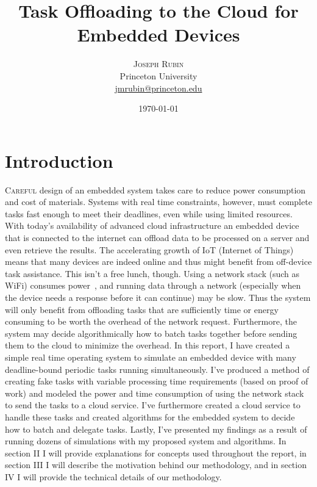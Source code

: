 \documentclass[twoside,twocolumn]{article}
\title{Task Offloading to the Cloud for Embedded Devices} %
\author{%
\textsc{Joseph Rubin} \\[1ex] %
\normalsize Princeton University \\ %
\normalsize \href{mailto:jmrubin@princeton.edu}{jmrubin@princeton.edu} %
}
\date{\today} %
\newcommand{\newp}{\newline\indent}
\begin{document}
\maketitle


\section{Introduction}

\lettrine[nindent=0em,lines=3]{C}{areful} design of an embedded system takes care to reduce power consumption and cost of materials.
Systems with real time constraints, however, must complete tasks fast enough to meet their deadlines, even while using limited resources.
With today's availability of advanced cloud infrastructure an embedded device that is connected to the internet can offload data to be processed on a server and even retrieve the results.
The accelerating growth of IoT (Internet of Things)~\cite{7750968} means that many devices are indeed online and thus might benefit from off-device task assistance.
\newp This isn't a free lunch, though.
Using a network stack (such as WiFi) consumes power~\cite{7545919}, and running data through a network (especially when the device needs a response before it can continue) may be slow.
Thus the system will only benefit from offloading tasks that are sufficiently time or energy consuming to be worth the overhead of the network request.
Furthermore, the system may decide algorithmically how to batch tasks together before sending them to the cloud to minimize the overhead.
\newp In this report, I have created a simple real time operating system to simulate an embedded device with many deadline-bound periodic tasks running simultaneously.
I've produced a method of creating fake tasks with variable processing time requirements (based on proof of work) and modeled the power and time consumption of using the network stack to send the tasks to a cloud service.
I've furthermore created a cloud service to handle these tasks and created algorithms for the embedded system to decide how to batch and delegate tasks.
Lastly, I've presented my findings as a result of running dozens of simulations with my proposed system and algorithms.
\newp In section II I will provide explanations for concepts used throughout the report, in section III I will describe the motivation behind our methodology, and in section IV I will provide the technical details of our methodology.
\end{document}
